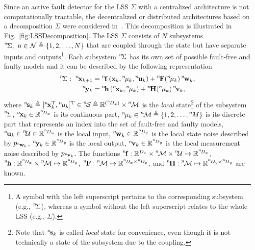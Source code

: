 \documentclass[conference,letterpaper]{IEEEtran}
\def\nth{\prescript{n\!}{}}
\begin{document}
Since an active fault detector for the LSS $\Sigma$ with a centralized architecture is not computationally tractable, the decentralized or distributed architectures based on a decomposition $\Sigma$ were considered in~\cite{Puncochar2019:cp:ACC,Straka2019:cp:FUSION}. 
This decomposition is illustrated  in Fig.~\ref{fig:LSSDecomposition}. 
The LSS $\Sigma$ consists of $N$ subsystems $\nth{\Sigma},\ n\in\mcN\triangleq\{1,2,\ldots,N\}$ that are coupled through the state but have separate inputs and outputs\footnote{A symbol with the left superscript pertains to the corresponding subsystem (e.g., $\nth{\Sigma}$), whereas a symbol without the left superscript relates to the whole LSS (e.g., $\Sigma$).}. 
Each subsystem $\nth{\Sigma}$ has its own set of possible fault-free and faulty models and it can be described by the following representation
\begin{subequations}
	\label{ali:subsystem}
	\begin{align}
		\nth{\Sigma}:\ \nth{\bfx}_{k+1} & = \nth{\bff} \left(\bfx_{k},\nth{\mu}_{k},\nth{\bfu}_{k} \right) + \nth{\bfF}(\nth{\mu}_k)\nth{\bfw}_k, \label{ali:subsystemDynamics} \\
		\nth{\bfy}_{k} &= \nth{\bfh} \left(\nth{\bfx}_{k},\nth{\mu}_{k}\right) + \nth{\bfH}(\nth{\mu}_k)\nth{\bfv}_k, \label{ali:subsystemObservation}
	\end{align}
\end{subequations}
where $\nth{\bfs}_{k} \triangleq [\nth{\bfx}^{\T}_{k}, \nth{\mu}_{k}]^{\T} \in \nth{\mcS} \triangleq \bbR^{(\nth{D}_x)} \times \nth{\mcM}$ is the \emph{local} state\footnote{Note that $\nth{\bfs}_{k}$ is called \emph{local} state for convenience, even though it is not technically a state of the subsystem due to the coupling.} of the subsystem $\nth{\Sigma}$, $\nth{\bfx}_{k}\in\bbR^{\nth{D}_x}$ is its continuous part, $\nth{\mu}_{k}\in\nth{\mcM}\triangleq\{1,2,\ldots,\nth{M}\}$ is its discrete part that represents an index into the set of fault-free and faulty models, $\nth{\bfu}_k\in\nth{\mcU}\in\bbR^{\nth{D}_u}$ is the local input, $\nth{\bfw}_k\in\bbR^{\nth{D}_x}$ is the local state noise described by $p_{\nth{\bfw}_k}$, $\nth{\bfy}_k\in\bbR^{\nth{D}_y}$ is the local output, $\nth{\bfv}_k\in\bbR^{\nth{D}_y}$ is the local measurement noise described by $p_{\nth{\bfv}_k}$. 
The functions $\nth{\bff}:\bbR^{D_{x}} \times \nth{\mcM} \times \nth{\mcU} \mapsto \bbR^{\nth{D}_{x}}$, $\nth{\bfh}:\bbR^{\nth{D}_{x}} \times \nth{\mcM} \mapsto \bbR^{\nth{D}_{y}}$, $\nth{\bfF}:\nth{\mcM}\mapsto \bbR^{\nth{D}_{x} \times \nth{D}_{x}}$, and $\nth{\bfH}:\nth{\mcM} \mapsto \bbR^{\nth{D}_{y} \times \nth{D}_{y}}$ are known. 
\end{document}

